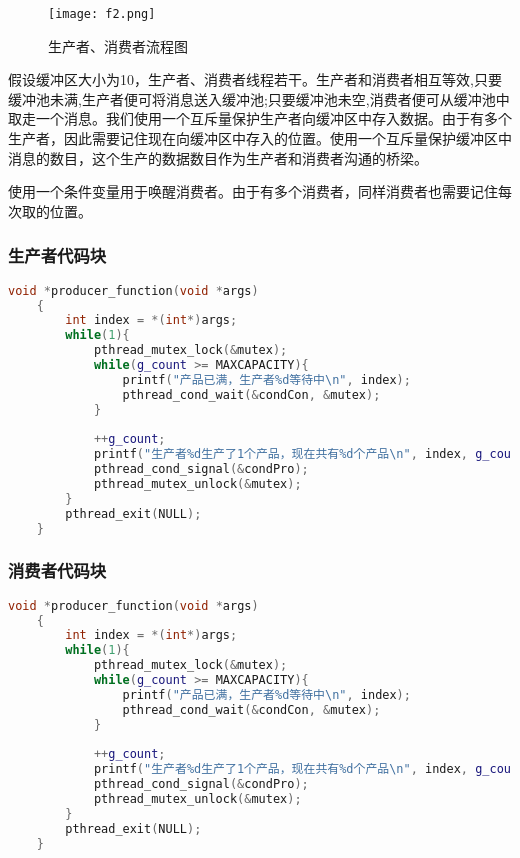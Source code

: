 \documentclass[withoutpreface,bwprint]{cumcmthesis} %
\begin{document}
\begin{figure}[H]
	\centering
	\texttt{[image: f2.png]}
	\caption{ 生产者、消费者流程图 \label{fig:1}}
\end{figure}

假设缓冲区大小为10，生产者、消费者线程若干。生产者和消费者相互等效,只要缓冲池未满,生产者便可将消息送入缓冲池;只要缓冲池未空,消费者便可从缓冲池中取走一个消息。我们使用一个互斥量保护生产者向缓冲区中存入数据。由于有多个生产者，因此需要记住现在向缓冲区中存入的位置。使用一个互斥量保护缓冲区中消息的数目，这个生产的数据数目作为生产者和消费者沟通的桥梁。

使用一个条件变量用于唤醒消费者。由于有多个消费者，同样消费者也需要记住每次取的位置。

\subsubsection*{生产者代码块}
\begin{lstlisting}[language=c++]
    void *producer_function(void *args)
    {
        int index = *(int*)args;
        while(1){
            pthread_mutex_lock(&mutex);
            while(g_count >= MAXCAPACITY){
                printf("产品已满，生产者%d等待中\n", index);
                pthread_cond_wait(&condCon, &mutex);
            }
     
            ++g_count;
            printf("生产者%d生产了1个产品，现在共有%d个产品\n", index, g_count);
            pthread_cond_signal(&condPro);
            pthread_mutex_unlock(&mutex);
        }
        pthread_exit(NULL);
    }
\end{lstlisting}

\subsubsection*{消费者代码块}
\begin{lstlisting}[language=c++]
    void *producer_function(void *args)
    {
        int index = *(int*)args;
        while(1){
            pthread_mutex_lock(&mutex);
            while(g_count >= MAXCAPACITY){
                printf("产品已满，生产者%d等待中\n", index);
                pthread_cond_wait(&condCon, &mutex);
            }
     
            ++g_count;
            printf("生产者%d生产了1个产品，现在共有%d个产品\n", index, g_count);
            pthread_cond_signal(&condPro);
            pthread_mutex_unlock(&mutex);
        }
        pthread_exit(NULL);
    }
\end{lstlisting}
\end{document}
